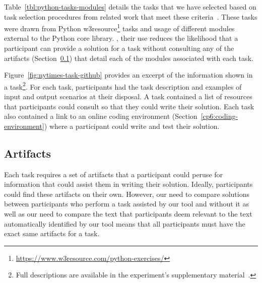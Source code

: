 Table~\ref{tbl:python-tasks-modules} details the tasks that we have selected based on task selection procedures from related work that meet these criteria~\cite{thiselton2019}. 
These tasks were drawn from
Python w3resource\footnote{\url{https://www.w3resource.com/python-exercises/}} tasks and
 usage of different modules external to the Python core library. , their use reduces the likelihood that a participant 
can provide a solution for a task without consulting any of the artifacts (Section~\ref{cp6:experiment-artifacts}) that detail each of the modules associated with each task. 








Figure~\ref{fig:nytimes-task-github} provides an excerpt of the information shown in a task\footnote{Full descriptions are available in the experiment's supplementary material~\cite{dspython}.}.
For each task, participants had the task description and examples of input and output scenarios at their disposal. A task contained a list of resources that participants could consult 
so that they could write their solution.
Each task also contained a link to an online coding environment (Section~\ref{cp6:coding-environment})
where a participant could write and test their solution. 







\subsection{Artifacts}
\label{cp6:experiment-artifacts}




Each task requires a set of artifacts that a participant could peruse for information that could assist them in writing their solution.
Ideally, participants could find these artifacts on their own. However, our need to compare solutions between participants who perform a task 
assisted by our tool and without it as well as our need to compare the text that participants deem relevant to the text
automatically identified by our tool means that all participants must have the exact same artifacts for a task.


